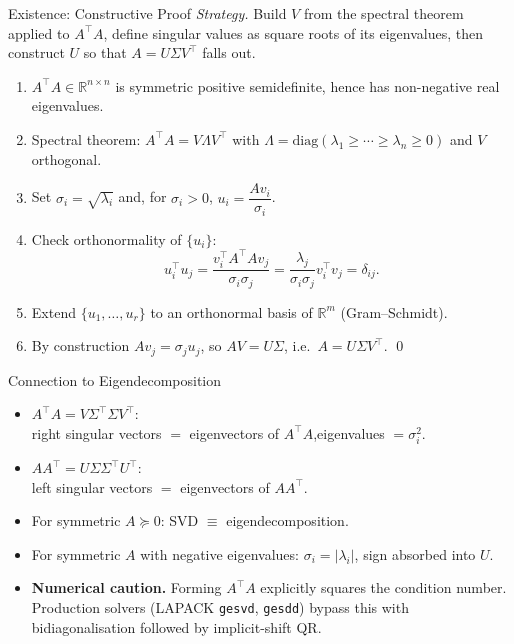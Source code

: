 \documentclass[10pt,aspectratio=169]{beamer}
\newcommand{\R}{\mathbb{R}}
\begin{document}
\begin{frame}{Existence: Constructive Proof}
  \emph{Strategy.} Build $V$ from the spectral theorem applied to $A^\top A$, define singular values as square roots of its eigenvalues, then construct $U$ so that $A = U\Sigma V^\top$ falls out.
  \begin{enumerate}
    \item $A^\top A \in \R^{n\times n}$ is symmetric positive semidefinite, hence has non-negative real eigenvalues.
    \item Spectral theorem: $A^\top A = V \Lambda V^\top$ with $\Lambda = \mathrm{diag}(\lambda_1 \geq \cdots \geq \lambda_n \geq 0)$ and $V$ orthogonal.
    \item Set $\sigma_i = \sqrt{\lambda_i}$ and, for $\sigma_i > 0$, $u_i = \dfrac{Av_i}{\sigma_i}$.
    \item Check orthonormality of $\{u_i\}$:
      \[
        u_i^\top u_j = \frac{v_i^\top A^\top A v_j}{\sigma_i \sigma_j} = \frac{\lambda_j}{\sigma_i \sigma_j} v_i^\top v_j = \delta_{ij}.
      \]
    \item Extend $\{u_1,\dots,u_r\}$ to an orthonormal basis of $\R^m$ (Gram--Schmidt).
    \item By construction $A v_j = \sigma_j u_j$, so $AV = U\Sigma$, i.e.\ $A = U \Sigma V^\top$. \qed
  \end{enumerate}
\end{frame}

\begin{frame}{Connection to Eigendecomposition}
  \begin{itemize}
    \item $A^\top A = V \Sigma^\top \Sigma V^\top$:\\
      right singular vectors $=$ eigenvectors of $A^\top A$,\quad eigenvalues $= \sigma_i^2$.
    \item $A A^\top = U \Sigma \Sigma^\top U^\top$:\\
      left singular vectors $=$ eigenvectors of $A A^\top$.
    \item For symmetric $A \succeq 0$: SVD $\equiv$ eigendecomposition.
    \item For symmetric $A$ with negative eigenvalues: $\sigma_i = |\lambda_i|$, sign absorbed into $U$.
    \item \textbf{Numerical caution.} Forming $A^\top A$ explicitly squares the condition number. Production solvers (LAPACK \texttt{gesvd}, \texttt{gesdd}) bypass this with bidiagonalisation followed by implicit-shift QR.
  \end{itemize}
\end{frame}
\end{document}
